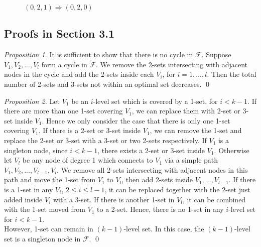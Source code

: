 \documentclass[runningheads,a4paper]{llncs}
\numberwithin{equation}{section}
\begin{document}
\begin{figure}
\begin{center}
\caption{$(0,2,1)\Rightarrow (0,2,0)$}
\end{center}
\end{figure}

\subsection{Proofs in Section 3.1}

\begin{proof}[Proposition 1]
It is sufficient to show that there is no cycle in $\mathscr{F}$. Suppose $V_1,V_2,...,V_l$ form a cycle in $\mathscr{F}$. We remove the 2-sets intersecting with adjacent nodes in the cycle and add the 2-sets inside each $V_i$, for $i=1,...,l$. Then the total number of 2-sets and 3-sets not within an optimal set decreases. \qed
\end{proof}

\begin{proof}[Proposition 2]
Let $V_1$ be an $i$-level set which is covered by a 1-set, for $i<k-1$. If there are more than one 1-set covering $V_1$, we can replace them with 2-set or 3-set inside $V_1$. Hence we only consider the case that there is only one 1-set covering $V_1$. If there is a 2-set or 3-set inside $V_1$, we can remove the 1-set and replace the 2-set or 3-set with a 3-set or two 2-sets respectively. If $V_1$ is a singleton node, since $i<k-1$, there exists a 2-set or 3-set inside $V_1$. Otherwise let $V_l$ be any node of degree 1 which connects to $V_1$ via a simple path $V_1,V_2,...,V_{l-1},V_l$. We remove all 2-sets intersecting with adjacent nodes in this path and move the 1-set from $V_1$ to $V_l$, then add 2-sets inside $V_1,...,V_{l-1}$. If there is a 1-set in any $V_i$, $2\leq i\leq l-1$, it can be replaced together with the 2-set just added inside $V_i$ with a 3-set. If there is another 1-set in $V_l$, it can be combined with the 1-set moved from $V_1$ to a 2-set. Hence, there is no 1-set in any $i$-level set for $i<k-1$. \\ However, 1-set can remain in $(k-1)$-level set. In this case, the $(k-1)$-level set is a singleton node in $\mathscr{F}$. \qed
\end{proof}
\end{document}
